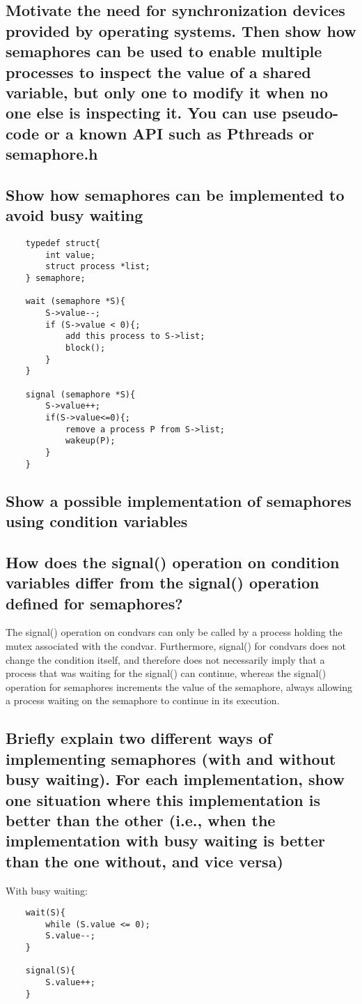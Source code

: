\documentclass{article}
\begin{document}
\subsection{Motivate the need for synchronization devices provided by operating systems. Then show how semaphores can be used to enable multiple processes to inspect the value of a shared variable, but only one to modify it when no one else is inspecting it. You can use pseudo-code or a known API such as Pthreads or semaphore.h}



\subsection{Show how semaphores can be implemented to avoid busy waiting}
\begin{verbatim}
    typedef struct{
        int value;
        struct process *list;
    } semaphore;
    
    wait (semaphore *S){
        S->value--;
        if (S->value < 0){;
            add this process to S->list;
            block();
        }
    }
    
    signal (semaphore *S){
        S->value++;
        if(S->value<=0){;
            remove a process P from S->list;
            wakeup(P);
        }
    }
    \end{verbatim}

\subsection{Show a possible implementation of semaphores using condition variables}

\subsection{How does the signal() operation on condition variables differ from the signal() operation defined for semaphores?}
The signal() operation on condvars can only be called by a process holding the mutex associated with the condvar. Furthermore, signal() for condvars does not change the condition itself, and therefore does not necessarily imply that a process that was waiting for the signal() can continue, whereas the signal() operation for semaphores increments the value of the semaphore, always allowing a process waiting on the semaphore to continue in its execution.

\subsection{Briefly explain two different ways of implementing semaphores (with and without busy waiting). For each implementation, show one situation where this implementation is better than the other (i.e., when the implementation with busy waiting is better than the one without, and vice versa)}
With busy waiting:
\begin{verbatim}
    wait(S){
        while (S.value <= 0);
        S.value--;
    }
    
    signal(S){
        S.value++;
    }
\end{verbatim}
\end{document}
